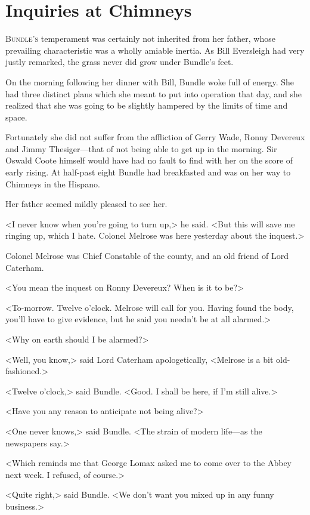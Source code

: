 \chapter{Inquiries at Chimneys}

\lettrine{B}{undle's} temperament was certainly not inherited from her father, whose prevailing characteristic was a wholly amiable inertia. As Bill Eversleigh had very justly remarked, the grass never did grow under Bundle's feet.

On the morning following her dinner with Bill, Bundle woke full of energy. She had three distinct plans which she meant to put into operation that day, and she realized that she was going to be slightly hampered by the limits of time and space.

Fortunately she did not suffer from the affliction of Gerry Wade, Ronny Devereux and Jimmy Thesiger—that of not being able to get up in the morning. Sir Oswald Coote himself would have had no fault to find with her on the score of early rising. At half-past eight Bundle had breakfasted and was on her way to Chimneys in the Hispano.

Her father seemed mildly pleased to see her.

<I never know when you're going to turn up,> he said. <But this will save me ringing up, which I hate. Colonel Melrose was here yesterday about the inquest.>

Colonel Melrose was Chief Constable of the county, and an old friend of Lord Caterham.

<You mean the inquest on Ronny Devereux? When is it to be?>

<To-morrow. Twelve o'clock. Melrose will call for you. Having found the body, you'll have to give evidence, but he said you needn't be at all alarmed.>

<Why on earth should I be alarmed?>

<Well, you know,> said Lord Caterham apologetically, <Melrose is a bit old-fashioned.>

<Twelve o'clock,> said Bundle. <Good. I shall be here, if I'm still alive.>

<Have you any reason to anticipate not being alive?>

<One never knows,> said Bundle. <The strain of modern life—as the newspapers say.>

<Which reminds me that George Lomax asked me to come over to the Abbey next week. I refused, of course.>

<Quite right,> said Bundle. <We don't want you mixed up in any funny business.>

